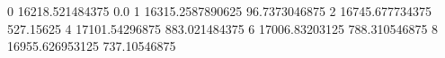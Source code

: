 0 16218.521484375 0.0
1 16315.2587890625 96.7373046875
2 16745.677734375 527.15625
4 17101.54296875 883.021484375
6 17006.83203125 788.310546875
8 16955.626953125 737.10546875

